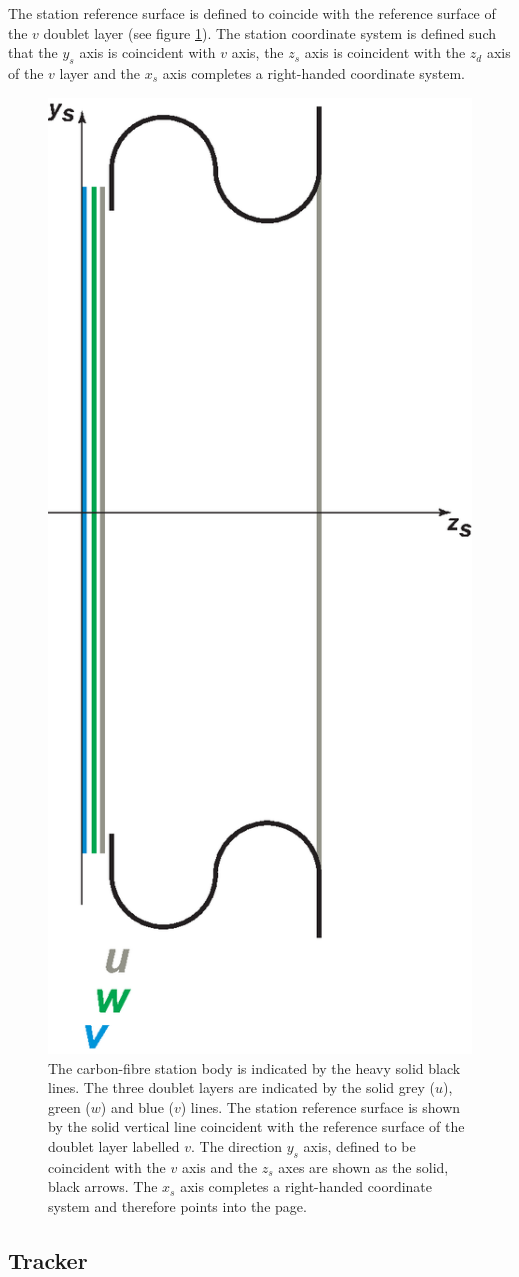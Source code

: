 The station reference surface is defined to coincide with the
reference surface of the $v$ doublet layer (see figure
\ref{Fig:StnRef&Coord}).
The station coordinate system is defined such that the $y_s$ axis is
coincident with $v$ axis, the $z_s$ axis is coincident with the $z_d$ axis
of the $v$ layer and the $x_s$ axis completes a right-handed coordinate
system.
\begin{figure}
  \begin{center}
    \includegraphics[width=0.25\linewidth]
      {03-Reference-surfaces-and-coordinate-systems/Figures/station.eps}
  \end{center}
  \caption{
    The carbon-fibre station body is indicated by the heavy solid
    black lines.
    The three doublet layers are indicated by the solid grey ($u$),
    green ($w$) and blue ($v$) lines.
    The station reference surface is shown by the solid vertical 
    line coincident with the reference surface of the doublet layer
    labelled $v$. 
    The direction $y_s$ axis, defined to be coincident with the $v$ axis
    and the $z_s$ axes are shown as the solid, black arrows.
    The $x_s$ axis completes a right-handed coordinate system and
    therefore points into the page.
  }
  \label{Fig:StnRef&Coord}
\end{figure}

\subsection{Tracker}
\label{SubSect:TrkrCoordStn}

